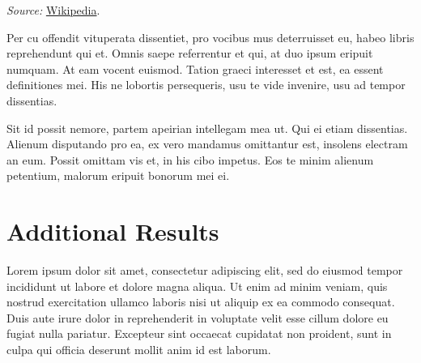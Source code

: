 \documentclass[12pt]{article}
\begin{document}
\begin{table}[tb]
\begin{threeparttable}
\begin{adjustbox}{center}
\begin{tabularx}{\textwidth}{@{}
          >{\hsize=.9\hsize}R >{\hsize}R >{\hsize}R >{\hsize=.9\hsize}R
      @{}}
        \bottomrule
      \end{tabularx}
    \end{adjustbox}

    \begin{tablenotes}\setlength{}\small
      \item \textit{Source:} \href{https://en.wikipedia.org/wiki/List_of_countries_by_population_(United_Nations)}{Wikipedia}.
    \end{tablenotes}
  \end{threeparttable}

\end{table}

Per cu offendit vituperata dissentiet, pro vocibus mus deterruisset eu, habeo libris reprehendunt qui et. Omnis saepe referrentur et qui, at duo ipsum eripuit numquam. At eam vocent euismod. Tation graeci interesset et est, ea essent definitiones mei. His ne lobortis persequeris, usu te vide invenire, usu ad tempor dissentias.

Sit id possit nemore, partem apeirian intellegam mea ut. Qui ei etiam dissentias. Alienum disputando pro ea, ex vero mandamus omittantur est, insolens electram an eum. Possit omittam vis et, in his cibo impetus. Eos te minim alienum petentium, malorum eripuit bonorum mei ei.


\newpage



\newpage
\appendix

\section{Additional Results}

Lorem ipsum dolor sit amet, consectetur adipiscing elit, sed do eiusmod tempor incididunt ut labore et dolore magna aliqua. Ut enim ad minim veniam, quis nostrud exercitation ullamco laboris nisi ut aliquip ex ea commodo consequat. Duis aute irure dolor in reprehenderit in voluptate velit esse cillum dolore eu fugiat nulla pariatur. Excepteur sint occaecat cupidatat non proident, sunt in culpa qui officia deserunt mollit anim id est laborum.
\end{document}
